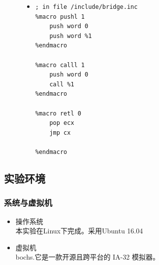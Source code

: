 \documentclass[a4paper]{article}
\begin{document}
    \begin{figure}[!hbt]
    \begin{itemize}
    \item[] \begin{lstlisting}[language={[x86masm]Assembler}, label=lst:workaround, caption=解决函数调用时地址长度不一致的问题]
; in file /include/bridge.inc
%macro pushl 1
    push word 0
    push word %1
%endmacro

%macro calll 1
    push word 0
    call %1
%endmacro

%macro retl 0
    pop ecx
    jmp cx

%endmacro
    \end{lstlisting}
    \end{itemize}
    \end{figure}
    \subsection{实验环境}
    \subsubsection{系统与虚拟机}
    \begin{itemize} \item 操作系统 \\ 
        本实验在Linux下完成。采用Ubuntu 16.04
        \item 虚拟机\\
        bochs.它是一款开源且跨平台的 IA-32 模拟器。
    \end{itemize}
\end{document}
